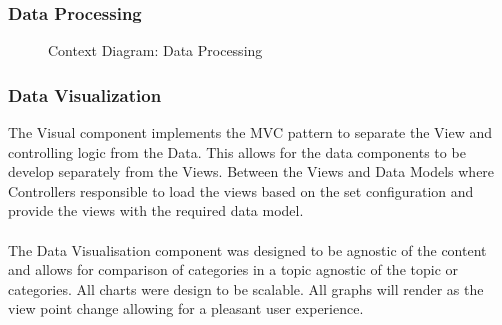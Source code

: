 \documentclass[12pt]{article} %
\begin{document}
	\subsubsection{Data Processing}
	
	\begin{figure}[H] %
		\caption{Context Diagram: Data Processing}
		\label{fig:speciation}
	\end{figure}
	
	\subsubsection{Data Visualization}
	
	The Visual component implements the MVC pattern to separate the View and controlling logic from the Data. This allows for the data components to be develop separately from the Views. Between the Views and Data Models where Controllers responsible to load the views based on the set configuration and provide the views with the required data model.\\
	\\
	The Data Visualisation component was designed to be agnostic of the content and allows for comparison of categories in a topic agnostic of the topic or categories.
	All charts were design to be scalable. All graphs will render as the view point change allowing for a pleasant user experience.
	
\end{document}
